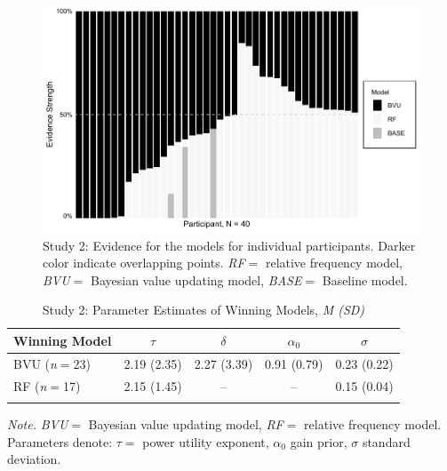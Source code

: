 \documentclass[a4paper, man, floatsintext]{apa6}
\begin{document}
\begin{figure}[htb]

{\centering \includegraphics[width=.9\linewidth]{../figures/fig4-1} 

}

\caption{Study 2: Evidence for the models for individual participants. Darker color indicate overlapping points. \textit{RF}$=$ relative frequency model, \textit{BVU}$=$ Bayesian value updating model, \textit{BASE}$=$ Baseline model.}\label{fig:fig4}
\end{figure}

\begin{table}[tbp]

\begin{center}
\begin{threeparttable}

\caption{\label{tab:parameter_study2}Study 2: Parameter Estimates of Winning Models, \textit{M (SD)}}

\begin{tabular}{lcccc}
\toprule
Winning Model & $\tau$ & $\delta$ & $\alpha_0$ & $\sigma$\\
\midrule
BVU (\textit{n}$=$23) & 2.19 (2.35) & 2.27 (3.39) & 0.91 (0.79) & 0.23 (0.22)\\
RF (\textit{n}$=$17) & 2.15 (1.45) & -- & -- & 0.15 (0.04)\\
\bottomrule
\addlinespace
\end{tabular}

\begin{tablenotes}[para]
\normalsize{\textit{Note.} \textit{BVU}$=$ Bayesian value updating model, \textit{RF}$=$ relative frequency model. Parameters denote: $\tau=$ power utility exponent, $\alpha_0$ gain prior, $\sigma$ standard deviation.}
\end{tablenotes}

\end{threeparttable}
\end{center}

\end{table}
\end{document}
